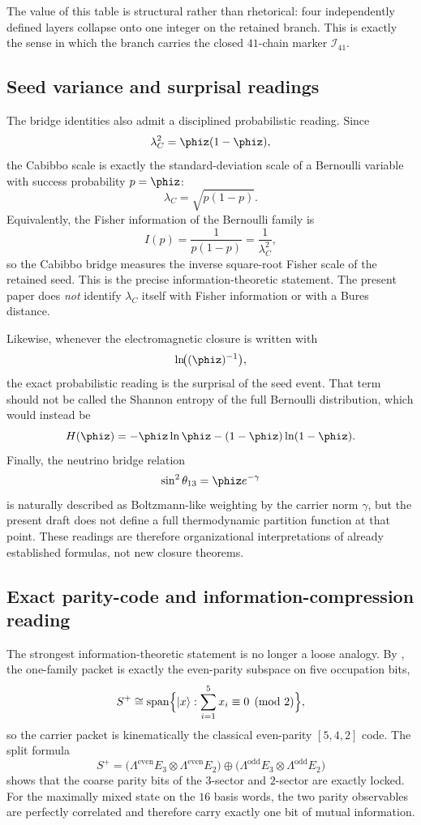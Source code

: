 The value of this table is structural rather than rhetorical: four independently defined layers
collapse onto one integer on the retained branch. This is exactly the sense in which the branch
carries the closed $41$-chain marker $\mathcal I_{41}$.

\subsection{Seed variance and surprisal readings}

The bridge identities also admit a disciplined probabilistic reading. Since
\[
\lambda_C^2=\phiz(1-\phiz),
\]
the Cabibbo scale is exactly the standard-deviation scale of a Bernoulli variable with success probability $p=\phiz$:
\[
\lambda_C=\sqrt{p(1-p)}.
\]
Equivalently, the Fisher information of the Bernoulli family is
\[
I(p)=\frac{1}{p(1-p)}=\frac{1}{\lambda_C^2},
\]
so the Cabibbo bridge measures the inverse square-root Fisher scale of the retained seed. This is the precise information-theoretic statement. The present paper does \emph{not} identify $\lambda_C$ itself with Fisher information or with a Bures distance.

Likewise, whenever the electromagnetic closure is written with
\[
\ln\!\bigl((\phiz)^{-1}\bigr),
\]
the exact probabilistic reading is the surprisal of the seed event. That term should not be called the Shannon entropy of the full Bernoulli distribution, which would instead be
\[
H(\phiz)
=
-\phiz\ln\phiz-(1-\phiz)\ln(1-\phiz).
\]
Finally, the neutrino bridge relation
\[
\sin^2\theta_{13}=\phiz e^{-\gamma}
\]
is naturally described as Boltzmann-like weighting by the carrier norm $\gamma$, but the present draft does not define a full thermodynamic partition function at that point. These readings are therefore organizational interpretations of already established formulas, not new closure theorems.

\subsection{Exact parity-code and information-compression reading}

The strongest information-theoretic statement is no longer a loose analogy. By , the one-family packet is exactly the even-parity subspace on five occupation bits,
\[
S^+
\cong
\mathrm{span}\Bigl\{|x\rangle:\sum_{i=1}^5 x_i\equiv 0 \pmod 2\Bigr\},
\]
so the carrier packet is kinematically the classical even-parity $[5,4,2]$ code. The split formula
\[
S^+
=
\bigl(\Lambda^{\mathrm{even}}E_3\otimes\Lambda^{\mathrm{even}}E_2\bigr)
\oplus
\bigl(\Lambda^{\mathrm{odd}}E_3\otimes\Lambda^{\mathrm{odd}}E_2\bigr)
\]
shows that the coarse parity bits of the $3$-sector and $2$-sector are exactly locked. For the maximally mixed state on the $16$ basis words, the two parity observables are perfectly correlated and therefore carry exactly one bit of mutual information.

